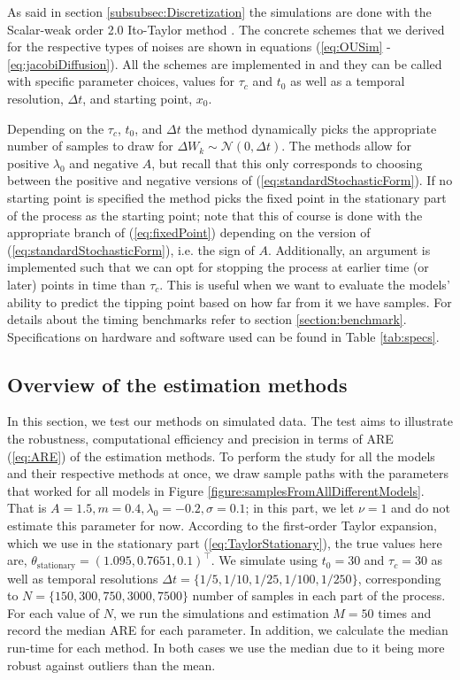 As said in section \ref{subsubsec:Discretization} the simulations are done with the Scalar-weak order 2.0 Ito-Taylor method \cite[algorithm 8.5]{Srkk2019}. The concrete schemes that we derived for the respective types of noises are shown in equations (\ref{eq:OUSim} - \ref{eq:jacobiDiffusion}). All the schemes are implemented in  and they can be called with specific parameter choices, values for $\tau_c$ and $t_0$ as well as a temporal resolution, $\Delta t$,  and starting point, $x_0$. 

Depending on the $\tau_c$, $t_0$, and $\Delta t$ the method dynamically picks the appropriate number of samples to draw for $\Delta W_k\sim\mathcal{N}\left(0,\Delta t\right)$. The methods allow for positive $\lambda_0$ and negative $A$, but recall that this only corresponds to choosing between the positive and negative versions of (\ref{eq:standardStochasticForm}). If no starting point is specified the method picks the fixed point in the stationary part of the process as the starting point; note that this of course is done with the appropriate branch of (\ref{eq:fixedPoint}) depending on the version of (\ref{eq:standardStochasticForm}), i.e. the sign of $A$. Additionally, an argument is implemented such that we can opt for stopping the process at earlier time (or later) points in time than $\tau_c$. This is useful when we want to evaluate the models' ability to predict the tipping point based on how far from it we have samples. For details about the timing benchmarks refer to section \ref{section:benchmark}. Specifications on hardware and software used can be found in Table \ref{tab:specs}. 
\subsection{Overview of the estimation methods}
In this section, we test our methods on simulated data. The test aims to illustrate the robustness, computational efficiency and precision in terms of ARE (\ref{eq:ARE}) of the estimation methods. To perform the study for all the models and their respective methods at once, we draw sample paths with the parameters that worked for all models in Figure \ref{figure:samplesFromAllDifferentModels}. That is $A = 1.5, m = 0.4, \lambda_0 = -0.2, \sigma = 0.1$; in this part, we let $\nu = 1$ and do not estimate this parameter for now. According to the first-order Taylor expansion, which we use in the stationary part (\ref{eq:TaylorStationary}), the true values here are, $\theta_{\mathrm{stationary}} = (1.095, 0.7651, 0.1)^\top$. We simulate using $t_0 = 30$ and $\tau_c = 30$ as well as temporal resolutions $\Delta t = \{1/5, 1/10, 1/25, 1/100, 1/250\}$, corresponding to $N = \{150, 300, 750, 3000, 7500\}$ number of samples in each part of the process. For each value of $N$, we run the simulations and estimation $M = 50$ times and record the median ARE for each parameter. In addition, we calculate the median run-time for each method. In both cases we use the median due to it being more robust against outliers than the mean.


